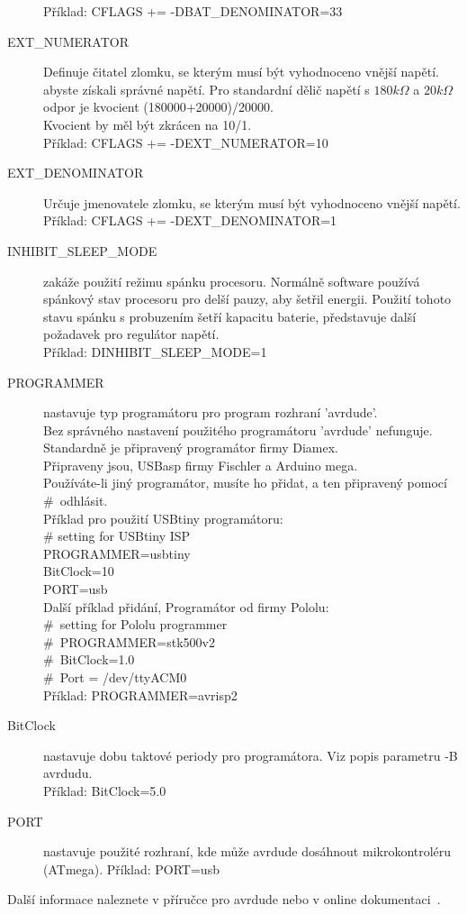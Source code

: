 \begin{description}
Příklad: CFLAGS += -DBAT\_DENOMINATOR=33
\vspace{-0,3cm}
 \item[EXT\_NUMERATOR] Definuje čitatel zlomku, se kterým musí být vyhodnoceno vnější napětí.
abyste získali správné napětí. Pro standardní dělič napětí s \(180 k\Omega\) a \(20 k\Omega\) odpor je kvocient (180000+20000)/20000.\\
Kvocient by měl být zkrácen na 10/1.\\
Příklad: CFLAGS += -DEXT\_NUMERATOR=10
\vspace{-0,3cm}
 \item[EXT\_DENOMINATOR] Určuje jmenovatele zlomku, se kterým musí být vyhodnoceno vnější napětí.\\
Příklad: CFLAGS += -DEXT\_DENOMINATOR=1
\vspace{-0,3cm}
  \item[INHIBIT\_SLEEP\_MODE] zakáže použití režimu spánku procesoru.
Normálně software používá spánkový stav procesoru pro delší pauzy, aby šetřil energii.
Použití tohoto stavu spánku s probuzením šetří kapacitu baterie,
představuje další požadavek pro regulátor napětí.\\
Příklad: DINHIBIT\_SLEEP\_MODE=1
\vspace{-0,3cm}
  \item[PROGRAMMER] \label{PROGRAMMER} nastavuje typ programátoru pro program rozhraní 'avrdude'.\\
Bez správného nastavení použitého programátoru 'avrdude' nefunguje.\\
Standardně je připravený programátor firmy Diamex.\\ 
Připraveny jsou, USBasp firmy Fischler a Arduino mega.\\
Používáte-li jiný programátor, musíte ho přidat, a ten připravený pomocí \#~odhlásit.\\
Příklad pro použití USBtiny programátoru:\\
\# setting for USBtiny ISP\\
PROGRAMMER=usbtiny\\
BitClock=10\\
PORT=usb\\
Další příklad přidání, Programátor od firmy Pololu:\\
\#~setting for Pololu programmer\\
\#~PROGRAMMER=stk500v2\\
\#~BitClock=1.0\\
\#~Port = /dev/ttyACM0\\
Příklad: PROGRAMMER=avrisp2
\vspace{-0,3cm}
  \item[BitClock] nastavuje dobu taktové periody pro programátora. Viz popis parametru -B avrdudu.\\
Příklad: BitClock=5.0
\vspace{-0,3cm}
  \item[PORT] nastavuje použité rozhraní, kde může avrdude dosáhnout mikrokontroléru (ATmega).
Příklad: PORT=usb
\end{description}
\vspace{-0,3cm}
Další informace naleznete v příručce pro avrdude nebo v online dokumentaci~\cite{avrdude}.

